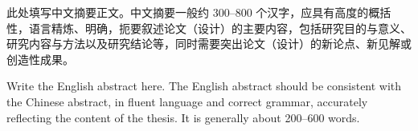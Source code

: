 \begin{cnabstract}
此处填写中文摘要正文。中文摘要一般约 300--800 个汉字，应具有高度的概括性，语言精炼、明确，扼要叙述论文（设计）的主要内容，包括研究目的与意义、研究内容与方法以及研究结论等，同时需要突出论文（设计）的新论点、新见解或创造性成果。


\end{cnabstract}

\begin{enabstract}

Write the English abstract here. The English abstract should be consistent with the Chinese abstract, in fluent language and correct grammar, accurately reflecting the content of the thesis. It is generally about 200--600 words.


\end{enabstract}
